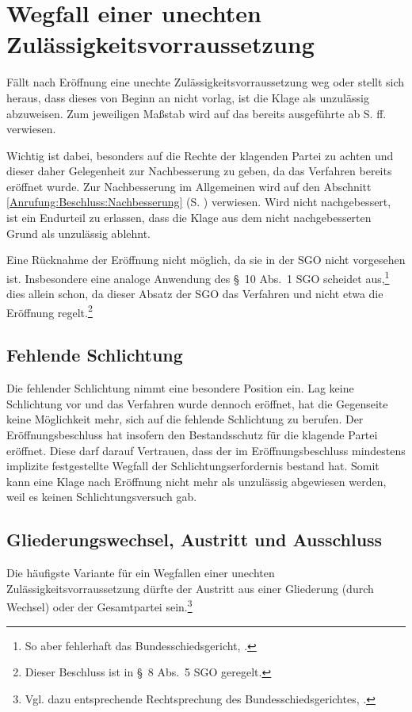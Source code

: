 \section{Wegfall einer unechten Zulässigkeitsvorraussetzung}
\label{Zulaessigkeit:Wegfall}
Fällt nach Eröffnung eine unechte Zulässigkeitsvorraussetzung weg oder stellt sich heraus, dass dieses von Beginn an nicht vorlag, ist die Klage als unzulässig abzuweisen.
Zum jeweiligen Maßstab wird auf das bereits ausgeführte ab S. \pageref{Anrufung:Statthaftigkeit} ff. verwiesen.

Wichtig ist dabei, besonders auf die Rechte der klagenden Partei zu achten und dieser daher Gelegenheit zur Nachbesserung zu geben, da das Verfahren bereits eröffnet wurde.
Zur Nachbesserung im Allgemeinen wird auf den Abschnitt \ref{Anrufung:Beschluss:Nachbesserung} (S. \pageref{Anrufung:Beschluss:Nachbesserung}) verwiesen.
Wird nicht nachgebessert, ist ein Endurteil zu erlassen, dass die Klage aus dem nicht nachgebesserten Grund als unzulässig ablehnt.

Eine Rücknahme der Eröffnung nicht möglich, da sie in der SGO nicht vorgesehen ist.
Insbesondere eine analoge Anwendung des \S~10 Abs.~1 SGO scheidet aus,\footnote{So aber fehlerhaft das Bundesschiedsgericht, \cite{BSGPP100127862}.} dies allein schon, da dieser Absatz der SGO das Verfahren und nicht etwa die Eröffnung regelt.\footnote{Dieser Beschluss ist in \S~8 Abs.~5 SGO geregelt.}

\subsection{Fehlende Schlichtung}
\label{Zulaessigkeit:Wegfall:Schlichtung}
Die fehlender Schlichtung nimmt eine besondere Position ein.
Lag keine Schlichtung vor und das Verfahren wurde dennoch eröffnet, hat die Gegenseite keine Möglichkeit mehr, sich auf die fehlende Schlichtung zu berufen.
Der Eröffnungsbeschluss hat insofern den Bestandsschutz für die klagende Partei eröffnet.
Diese darf darauf Vertrauen, dass der im Eröffnungsbeschluss mindestens implizite festgestellte Wegfall der Schlichtungserfordernis bestand hat.
Somit kann eine Klage nach Eröffnung nicht mehr als unzulässig abgewiesen werden, weil es keinen Schlichtungsversuch gab.

\subsection{Gliederungswechsel, Austritt und Ausschluss}
\label{Zulaessigkeit:Wegfall:Austritt}
Die häufigste Variante für ein Wegfallen einer unechten Zulässigkeitsvorraussetzung dürfte der Austritt aus einer Gliederung (durch Wechsel) oder der Gesamtpartei sein.\footnote{Vgl. dazu entsprechende Rechtsprechung des Bundesschiedsgerichtes, \cites{BSG20121128}{BSG20130116}.}

